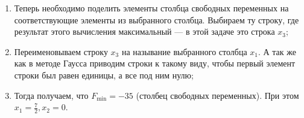 \begin{example}
\begin{enumerate}
		\item Теперь необходимо поделить элементы столбца свободных переменных на соответствующие элементы из выбранного столбца. Выбираем ту строку, где результат этого вычисления максимальный --- в этой задаче это строка $x_3$;
		
		\item Переименовываем строку $x_3$ на называние выбранного столбца $x_1$. А так же как в методе Гаусса приводим строки к такому виду, чтобы первый элемент строки был равен единицы, а все под ним нулю;
		
		\item Тогда получаем, что $F_{\min} = -35$ (столбец свободных переменных). При этом $x_1 = \frac{7}{2}, x_2 = 0$.
	\end{enumerate}
	
\end{example}

